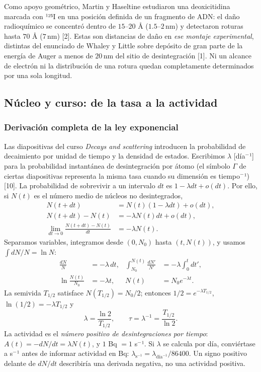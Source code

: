 \documentclass[11pt,a4paper,oneside]{article}
\begin{document}
Como apoyo geométrico, Martin y Haseltine estudiaron una deoxicitidina marcada con ¹²⁵I en una posición definida de un fragmento de ADN: el daño radioquímico se concentró dentro de \(15\)--\(20\) Å (\(1.5\)--\(2\,\mathrm{nm}\)) y detectaron roturas hasta \(70\) Å (\(7\,\mathrm{nm}\)) {[}2{]}. Estas son distancias de daño en \emph{ese montaje experimental}, distintas del enunciado de Whaley y Little sobre depósito de gran parte de la energía de Auger a menos de \(20\,\mathrm{nm}\) del sitio de desintegración {[}1{]}. Ni un alcance de electrón ni la distribución de una rotura quedan completamente determinados por una sola longitud.

\subsection{Núcleo y curso: de la tasa a la actividad}\label{nuxfacleo-y-curso-de-la-tasa-a-la-actividad}

\subsubsection{Derivación completa de la ley exponencial}\label{derivaciuxf3n-completa-de-la-ley-exponencial}

Las diapositivas del curso \emph{Decays and scattering} introducen la probabilidad de decaimiento por unidad de tiempo y la densidad de estados. Escribimos \(\lambda\) {[}día\(^{-}\)¹{]} para la probabilidad instantánea de desintegración por átomo (el símbolo \(\Gamma\) de ciertas diapositivas representa la misma tasa cuando su dimensión es tiempo\(^{-}\)¹) {[}10{]}. La probabilidad de sobrevivir a un intervalo \(dt\) es \(1-\lambda dt+o(dt)\). Por ello, si \(N(t)\) es el número medio de núcleos no desintegrados, \[\begin{aligned}
N(t+dt)&=N(t)(1-\lambda dt)+o(dt),\\
N(t+dt)-N(t)&=-\lambda N(t)dt+o(dt),\\
\lim_{dt\to0}\frac{N(t+dt)-N(t)}{dt}&=-\lambda N(t).
\end{aligned}\] Separamos variables, integramos desde \((0,N_0)\) hasta \((t,N(t))\), y usamos \(\int dN/N=\ln N\): \[\begin{aligned}
\frac{dN}{N}&=-\lambda\,dt, &
\int_{N_0}^{N(t)}\frac{dN'}{N'}&=-\lambda\int_0^t dt',\\
\ln\!\frac{N(t)}{N_0}&=-\lambda t, &N(t)&=N_0e^{-\lambda t}.
\end{aligned}\] La semivida \(T_{1/2}\) satisface \(N(T_{1/2})=N_0/2\); entonces \(1/2=e^{-\lambda T_{1/2}}\), \(\ln(1/2)=-\lambda T_{1/2}\) y \[\boxed{\lambda=\frac{\ln2}{T_{1/2}},\qquad \tau=\lambda^{-1}=\frac{T_{1/2}}{\ln2}.}\] La actividad es el \emph{número positivo de desintegraciones por tiempo}: \(A(t)=-dN/dt=\lambda N(t)\), y \(1\) Bq \(=1\) s\(^{-}\)¹. Si \(\lambda\) se calcula por día, conviértase a s\(^{-}\)¹ antes de informar actividad en Bq: \(\lambda_{\mathrm{s}^{-1}}=\lambda_{\mathrm{día}^{-1}}/86400\). Un signo positivo delante de \(dN/dt\) describiría una derivada negativa, no una actividad positiva.
\end{document}
